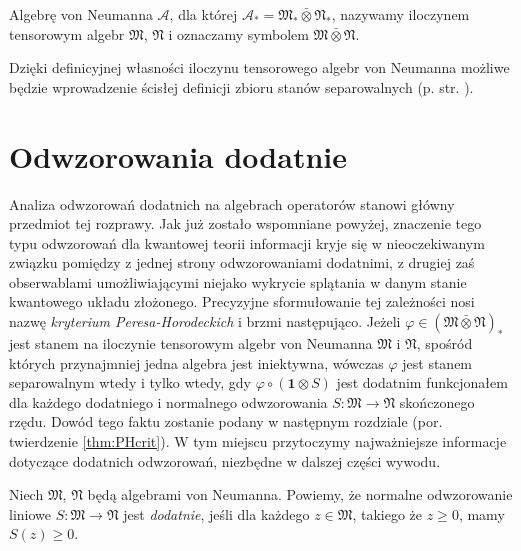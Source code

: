 \begin{Definition}
 \label{def:TensorProductOfvN}
    Algebrę von Neumanna $\mathcal{A}$, dla której
    $\mathcal{A}_{*} = \mathfrak{M}_{*} \bar{\otimes} \mathfrak{N}_{*}$,
    nazywamy iloczynem tensorowym algebr $\mathfrak{M}$, $\mathfrak{N}$
    i oznaczamy symbolem
    $\mathfrak{M} \bar{\otimes} \mathfrak{N}$.
\end{Definition}

Dzięki definicyjnej własności iloczynu tensorowego algebr von Neumanna
możliwe będzie wprowadzenie ścisłej definicji zbioru stanów separowalnych
(p. str. \pageref{def:SeparableStates}).

\section{Odwzorowania dodatnie}
Analiza odwzorowań dodatnich na algebrach operatorów stanowi główny przedmiot
tej rozprawy.
Jak już zostało wspomniane powyżej, znaczenie tego typu odwzorowań dla kwantowej
teorii informacji kryje się w nieoczekiwanym związku pomiędzy z jednej strony
odwzorowaniami dodatnimi,
z drugiej zaś obserwablami umożliwiającymi niejako wykrycie splątania w
danym stanie kwantowego układu złożonego.
Precyzyjne sformułowanie tej zależności nosi nazwę
\emph{kryterium Peresa-Horodeckich} i brzmi następująco.
Jeżeli $\varphi \in (\mathfrak{M} \bar{\otimes} \mathfrak{N})_{*}$ jest stanem
na iloczynie tensorowym algebr von Neumanna
$\mathfrak{M}$ i $\mathfrak{N}$,
spośród których przynajmniej jedna algebra jest iniektywna,
wówczas $\varphi$ jest stanem separowalnym wtedy i tylko wtedy,
gdy $\varphi \circ (\mathbf{1} \otimes S)$ jest dodatnim funkcjonałem
dla każdego dodatniego i normalnego odwzorowania
$S: \mathfrak{M} \rightarrow \mathfrak{N}$
skończonego rzędu.
Dowód tego faktu zostanie podany w następnym rozdziale
(por. twierdzenie \ref{thm:PHcrit}).
W tym miejscu przytoczymy najważniejsze informacje dotyczące dodatnich
odwzorowań, niezbędne w dalszej części wywodu.

\begin{Definition}
Niech $\mathfrak{M}$, $\mathfrak{N}$ będą algebrami von Neumanna.
Powiemy, że normalne odwzorowanie liniowe
$S: \mathfrak{M} \rightarrow \mathfrak{N}$
jest \emph{dodatnie},
jeśli dla każdego $z \in \mathfrak{M}$,
takiego że $z \geq 0$, mamy
$S(z) \geq 0$.
\end{Definition}

